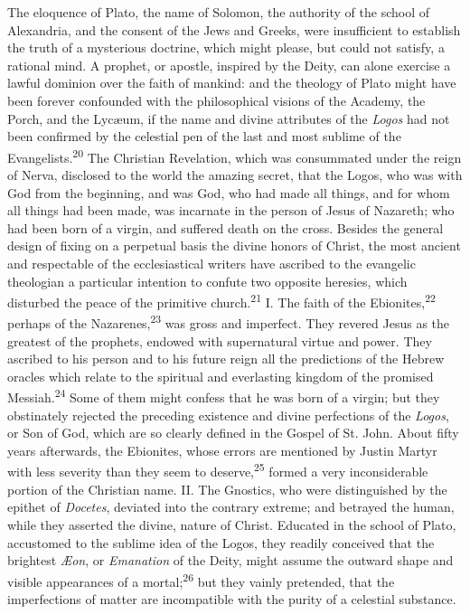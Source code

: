The eloquence of Plato, the name of Solomon, the authority of the
school of Alexandria, and the consent of the Jews and Greeks,
were insufficient to establish the truth of a mysterious
doctrine, which might please, but could not satisfy, a rational
mind. A prophet, or apostle, inspired by the Deity, can alone
exercise a lawful dominion over the faith of mankind: and the
theology of Plato might have been forever confounded with the
philosophical visions of the Academy, the Porch, and the Lycæum,
if the name and divine attributes of the \textit{Logos} had not been
confirmed by the celestial pen of the last and most sublime of
the Evangelists.\textsuperscript{20} The Christian Revelation, which was
consummated under the reign of Nerva, disclosed to the world the
amazing secret, that the Logos, who was with God from the
beginning, and was God, who had made all things, and for whom all
things had been made, was incarnate in the person of Jesus of
Nazareth; who had been born of a virgin, and suffered death on
the cross. Besides the general design of fixing on a perpetual
basis the divine honors of Christ, the most ancient and
respectable of the ecclesiastical writers have ascribed to the
evangelic theologian a particular intention to confute two
opposite heresies, which disturbed the peace of the primitive
church.\textsuperscript{21} I. The faith of the Ebionites,\textsuperscript{22} perhaps of the
Nazarenes,\textsuperscript{23} was gross and imperfect. They revered Jesus as the
greatest of the prophets, endowed with supernatural virtue and
power. They ascribed to his person and to his future reign all
the predictions of the Hebrew oracles which relate to the
spiritual and everlasting kingdom of the promised Messiah.\textsuperscript{24}
Some of them might confess that he was born of a virgin; but they
obstinately rejected the preceding existence and divine
perfections of the \textit{Logos}, or Son of God, which are so clearly
defined in the Gospel of St. John. About fifty years afterwards,
the Ebionites, whose errors are mentioned by Justin Martyr with
less severity than they seem to deserve,\textsuperscript{25} formed a very
inconsiderable portion of the Christian name. II. The Gnostics,
who were distinguished by the epithet of \textit{Docetes}, deviated into
the contrary extreme; and betrayed the human, while they asserted
the divine, nature of Christ. Educated in the school of Plato,
accustomed to the sublime idea of the Logos, they readily
conceived that the brightest \textit{Æon}, or \textit{Emanation} of the Deity,
might assume the outward shape and visible appearances of a
mortal;\textsuperscript{26} but they vainly pretended, that the imperfections of
matter are incompatible with the purity of a celestial substance.

